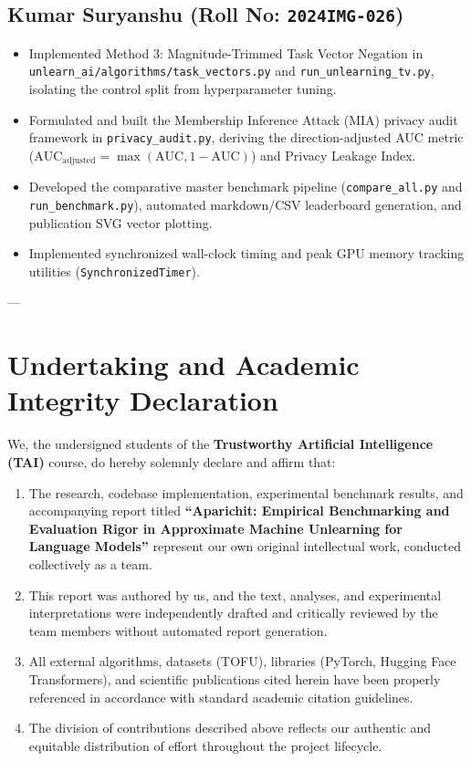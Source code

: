 \documentclass[11pt,a4paper]{article}
\begin{document}
\subsection*{Kumar Suryanshu (Roll No: \texttt{2024IMG-026})}
\begin{itemize}
    \item Implemented Method 3: Magnitude-Trimmed Task Vector Negation in \texttt{unlearn\_ai/algorithms/task\_vectors.py} and \texttt{run\_unlearning\_tv.py}, isolating the control split from hyperparameter tuning.
    \item Formulated and built the Membership Inference Attack (MIA) privacy audit framework in \texttt{privacy\_audit.py}, deriving the direction-adjusted AUC metric ($\text{AUC}_{\text{adjusted}} = \max(\text{AUC}, 1 - \text{AUC})$) and Privacy Leakage Index.
    \item Developed the comparative master benchmark pipeline (\texttt{compare\_all.py} and \texttt{run\_benchmark.py}), automated markdown/CSV leaderboard generation, and publication SVG vector plotting.
    \item Implemented synchronized wall-clock timing and peak GPU memory tracking utilities (\texttt{SynchronizedTimer}).
\end{itemize}

---

\section*{Undertaking and Academic Integrity Declaration}

We, the undersigned students of the \textbf{Trustworthy Artificial Intelligence (TAI)} course, do hereby solemnly declare and affirm that:
\begin{enumerate}
    \item The research, codebase implementation, experimental benchmark results, and accompanying report titled \textbf{``Aparichit: Empirical Benchmarking and Evaluation Rigor in Approximate Machine Unlearning for Language Models''} represent our own original intellectual work, conducted collectively as a team.
    \item This report was authored by us, and the text, analyses, and experimental interpretations were independently drafted and critically reviewed by the team members without automated report generation.
    \item All external algorithms, datasets (TOFU), libraries (PyTorch, Hugging Face Transformers), and scientific publications cited herein have been properly referenced in accordance with standard academic citation guidelines.
    \item The division of contributions described above reflects our authentic and equitable distribution of effort throughout the project lifecycle.
\end{enumerate}
\end{document}
